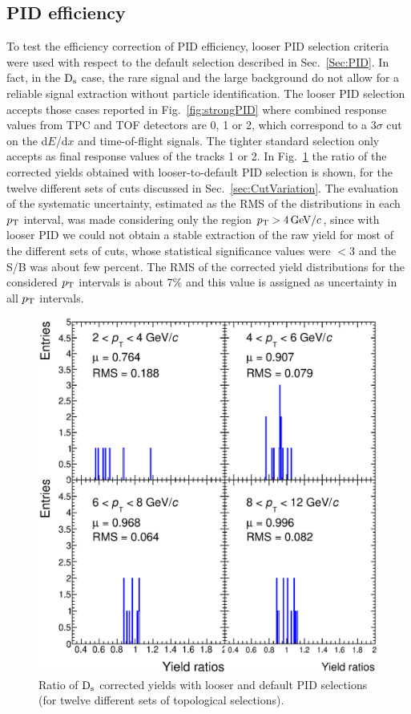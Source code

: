 \subsection{PID efficiency}
\label{sec:PIDsystPP}
To test the efficiency correction of PID efficiency, looser PID selection criteria were
used with respect to the default selection described in Sec.~\ref{Sec:PID}. 
In fact, in the ${\rm D_s}$ case, the rare signal and the large background 
do not allow for a reliable signal extraction without 
particle identification. The looser PID selection accepts those cases 
reported in Fig.~\ref{fig:strongPID} where combined response values from TPC and TOF 
detectors are 0, 1 or 2, which correspond to a 3$\sigma$ cut on the d$E$/d$x$ and
time-of-flight signals. The tighter standard selection only accepts as final
response values of the tracks 1 or 2.
In Fig.~\ref{fig:rmsPID} the ratio
of the corrected yields obtained with looser-to-default PID selection is shown, 
for the twelve different sets of cuts discussed in Sec.~\ref{sec:CutVariation}.
The evaluation of the systematic uncertainty, estimated as the RMS of the distributions in each $p_{\rm T}$ 
interval, was made considering only the region $p_{\rm T} > 4 \, \mathrm{GeV}/c$, since 
with looser PID we could not obtain a stable extraction of the raw yield for most
of the different sets of cuts, whose statistical significance values were $<3$ and the S/B was about few percent.
The RMS of the corrected yield distributions for the considered
$p_{\rm T}$ intervals is about 7\% and this value is assigned as uncertainty in all $p_{\rm T}$ intervals.

\begin{figure}[!htb]
\begin{center}
 \includegraphics[width=.7\textwidth]{FigCap4/PIDrms4x4}
\caption{Ratio of ${\rm D_s}$ corrected yields with looser and default PID selections (for twelve different sets of
topological selections).}
\label{fig:rmsPID}
\end{center}
\end{figure}

